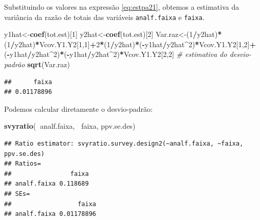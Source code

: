 \documentclass[]{book}
\newenvironment{Shaded}{\begin{snugshade}}{\end{snugshade}}
\newcommand{\KeywordTok}[1]{\textcolor[rgb]{0.13,0.29,0.53}{\textbf{#1}}}
\newcommand{\DecValTok}[1]{\textcolor[rgb]{0.00,0.00,0.81}{#1}}
\newcommand{\CommentTok}[1]{\textcolor[rgb]{0.56,0.35,0.01}{\textit{#1}}}
\newcommand{\OperatorTok}[1]{\textcolor[rgb]{0.81,0.36,0.00}{\textbf{#1}}}
\newcommand{\NormalTok}[1]{#1}
\theoremstyle{definition}
\theoremstyle{definition}
\theoremstyle{definition}
\theoremstyle{remark}
\begin{document}
Substituindo os valores na expressão \eqref{eq:estpa21}, obtemos a
estimativa da variância da razão de totais das variáveis
\texttt{analf.faixa} e \texttt{faixa}.

\begin{Shaded}
\begin{Highlighting}[]
\NormalTok{y1hat<-}\KeywordTok{coef}\NormalTok{(tot.est)[}\DecValTok{1}\NormalTok{]}
\NormalTok{y2hat<-}\KeywordTok{coef}\NormalTok{(tot.est)[}\DecValTok{2}\NormalTok{]}
\NormalTok{Var.raz<-(}\DecValTok{1}\OperatorTok{/}\NormalTok{y2hat)}\OperatorTok{*}\NormalTok{(}\DecValTok{1}\OperatorTok{/}\NormalTok{y2hat)}\OperatorTok{*}\NormalTok{Vcov.Y1.Y2[}\DecValTok{1}\NormalTok{,}\DecValTok{1}\NormalTok{]}\OperatorTok{+}\DecValTok{2}\OperatorTok{*}\NormalTok{(}\DecValTok{1}\OperatorTok{/}\NormalTok{y2hat)}\OperatorTok{*}\NormalTok{(}\OperatorTok{-}\NormalTok{y1hat}\OperatorTok{/}\NormalTok{y2hat}\OperatorTok{^}\DecValTok{2}\NormalTok{)}\OperatorTok{*}\NormalTok{Vcov.Y1.Y2[}\DecValTok{1}\NormalTok{,}\DecValTok{2}\NormalTok{]}\OperatorTok{+}
\NormalTok{(}\OperatorTok{-}\NormalTok{y1hat}\OperatorTok{/}\NormalTok{y2hat}\OperatorTok{^}\DecValTok{2}\NormalTok{)}\OperatorTok{*}\NormalTok{(}\OperatorTok{-}\NormalTok{y1hat}\OperatorTok{/}\NormalTok{y2hat}\OperatorTok{^}\DecValTok{2}\NormalTok{)}\OperatorTok{*}\NormalTok{Vcov.Y1.Y2[}\DecValTok{2}\NormalTok{,}\DecValTok{2}\NormalTok{]}
\CommentTok{# estimativa do desvio-padrão}
\KeywordTok{sqrt}\NormalTok{(Var.raz)}
\end{Highlighting}
\end{Shaded}

\begin{verbatim}
##      faixa 
## 0.01178896
\end{verbatim}

Podemos calcular diretamente o desvio-padrão:

\begin{Shaded}
\begin{Highlighting}[]
\KeywordTok{svyratio}\NormalTok{(}\OperatorTok{~}\NormalTok{analf.faixa, }\OperatorTok{~}\NormalTok{faixa, ppv.se.des)}
\end{Highlighting}
\end{Shaded}

\begin{verbatim}
## Ratio estimator: svyratio.survey.design2(~analf.faixa, ~faixa, ppv.se.des)
## Ratios=
##                faixa
## analf.faixa 0.118689
## SEs=
##                  faixa
## analf.faixa 0.01178896
\end{verbatim}
\end{document}
